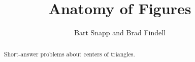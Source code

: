 \documentclass[nooutcomes]{ximera}
\title{Anatomy of Figures}
\author{Bart Snapp and Brad Findell}
\begin{document}
\begin{abstract}
Short-answer problems about centers of triangles. 
\end{abstract}
\maketitle
\end{document}
